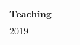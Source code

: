 \documentclass[letterpaper,6pt,oneside]{article}
\begin{document}
\begin{small}
\begin{longtable}{@{} l p{5.3in}l}
\Large{\textbf{Teaching}}  \vspace{5mm} \\
 \large{2019}

\end{longtable}
\end{small}
\end{document}

